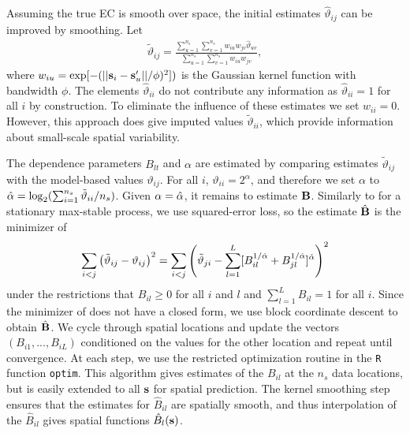 Assuming the true EC is smooth over space, the initial estimates ${\hat \vartheta}_{ij}$ can be improved by smoothing.
Let
\begin{align} \label{ebeq:EChat2}
  {\tilde \vartheta}_{ij} = \frac{\sum_{u=1}^{n_s}\sum_{v=1}^{n_s} w_{iu}w_{jv}{\hat \vartheta}_{uv}}
  {\sum_{u=1}^{n_s}\sum_{v=1}^{n_s} w_{iu}w_{jv}},
\end{align}
where $w_{iu} = \exp[-(||\mathbf{s}_i-\mathbf{s}_u'||/\phi)^2])$ is the Gaussian kernel function with bandwidth $\phi$.
The elements ${\hat \vartheta}_{ii}$ do not contribute any information as ${\hat \vartheta}_{ii}=1$ for all $i$ by construction.
To eliminate the influence of these estimates we set $w_{ii}=0$.
However, this approach does give imputed values ${\tilde \vartheta}_{ii}$, which provide information about small-scale spatial variability.

The dependence parameters $B_{lt}$ and $\alpha$ are estimated by comparing estimates ${\tilde \vartheta}_{ij}$ with the model-based values $\vartheta_{ij}$.
For all $i$, $\vartheta_{ii} = 2^{\alpha}$, and therefore we set $\alpha$ to $\hat{\alpha} = \log_2(\sum_{i=1}^{n_s}{\tilde \vartheta}_{ii}/n_s)$.
Given $\alpha=\hat{\alpha}$, it remains to estimate $\mathbf{B}$.
Similarly to \citet{Smith1990} for a stationary max-stable process, we use squared-error loss, so the estimate $\hat{\mathbf{B}}$ is the minimizer of
\begin{align} \label{ebeq:Bhat}
\sum_{i<j} \left({\tilde \vartheta}_{ij} - \vartheta_{ij}\right)^2
  =
  \sum_{i<j} \left({\tilde \vartheta}_{ji} - \sum_{l=1}^L[B_{il}^{1/\hat{\alpha}} + B_{jl}^{1/\hat{\alpha}}]^{\hat{\alpha}}\right)^2
\end{align}
under the restrictions that $B_{il}\ge 0$ for all $i$ and $l$ and $\sum_{l=1}^LB_{il}=1$ for all $i$.
Since the minimizer of  does not have a closed form, we use block coordinate descent to obtain ${\hat {\mathbf{B}}}$.
We cycle through spatial locations and update the vectors $(B_{i1},...,B_{iL})$ conditioned on the values for the other location and repeat until convergence.
At each step, we use the restricted optimization routine in the \texttt{R} function \texttt{optim}.
This algorithm gives estimates of the $B_{il}$ at the $n_s$ data locations, but is easily extended to all $\mathbf{s}$ for spatial prediction.
The kernel smoothing step ensures that the estimates for $\hat{B}_{il}$ are spatially smooth, and thus interpolation of the $\hat{B}_{il}$ gives spatial functions $\hat{B}_l(\mathbf{s})$.

